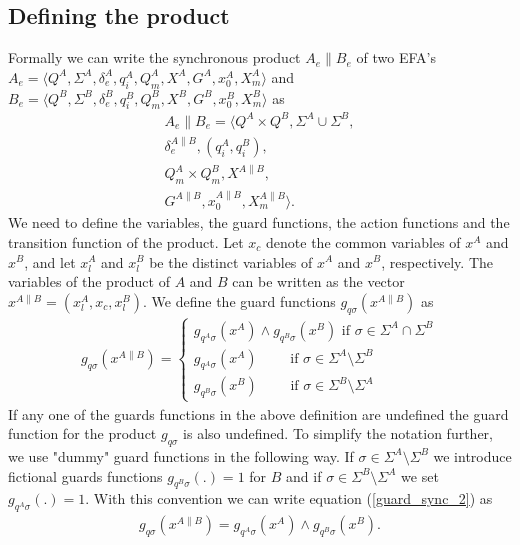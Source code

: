 \documentclass{article}
\begin{document}
\subsection{Defining the product}\label{defining the product}

Formally we can write the synchronous product $A_e \| B_e$ of two
EFA's $A_e=\langle Q^A, \Sigma^A, \delta^A_e, q^A_i, Q^A_m, X^A,
G^{A}, x^{A}_0, X^{A}_m \rangle$ and $B_e=\langle Q^B, \Sigma^B,
\delta^B_e, q^B_i, Q^B_m, X^B, G^{B}, x^{B}_0, X^{B}_m \rangle$ as
\begin{eqnarray}
A_e \| B_e=\langle Q^A\times Q^B, \Sigma^A \cup \Sigma^B ,\nonumber\\
\delta^{A\|B}_e, (q^{A}_i, q^{B}_i),\nonumber\\
 Q^A_m\times Q^B_m, X^{A\|B},\nonumber\\
G^{A\|B}, x^{A\|B}_0, X^{A\|B}_m\rangle.
\end{eqnarray}
We need to define the variables, the guard functions, the action
functions and the transition function of the product. Let $x_{c}$
denote the common variables of $x^{A}$ and $x^{B}$, and let
$x^A_l$ and $x^B_l$ be the distinct variables of $x^{A}$ and
$x^{B}$, respectively. The variables of the product of $A$ and $B$
can be written as the vector $x^{A\|B}=(x^A_l, x_{c}, x^B_l)$. We
define the guard functions $g_{q \sigma}(x^{A\|B})$ as
\begin{eqnarray}\label{guard_sync_2}
g_{q \sigma}(x^{A\|B})=\left\{
\begin{array}{ll}
g_{q^A\sigma}(x^{A})\wedge g_{q^B\sigma}(x^{B}) \textrm{ if }\sigma\in \Sigma^A \cap \Sigma^B\\
g_{q^A\sigma}(x^{A}) \quad\quad \textrm{ if } \sigma\in \Sigma^A \setminus \Sigma^B\\
g_{q^B\sigma}(x^{B}) \quad\quad \textrm{ if }
\sigma\in\Sigma^B\setminus \Sigma^A
\end{array}\right.
\end{eqnarray}
If any one of the guards functions in the above definition are
undefined the guard function for the product $g_{q \sigma}$ is
also undefined. To simplify the notation further, we use "dummy"
guard functions in the following way. If $\sigma\in \Sigma^A
\setminus \Sigma^B$ we introduce fictional guards functions
$g_{q^B\sigma}(.)=1$ for $B$ and if $\sigma\in\Sigma^B\setminus
\Sigma^A$ we set $g_{q^A\sigma}(.)=1$. With this convention we can
write equation (\ref{guard_sync_2}) as
\begin{eqnarray}
g_{q \sigma}(x^{A\|B})= g_{q^A\sigma}(x^{A})\wedge
g_{q^B\sigma}(x^{B}).
\end{eqnarray}
\end{document}
